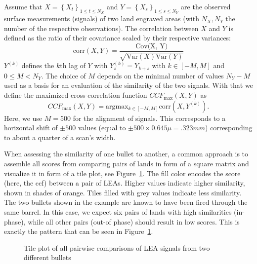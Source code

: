 \documentclass[
  12pt]{article}
\begin{document}
Assume that \(X = \left\{X_t\right\}_{1 \le t \le N_X}\) and
\(Y = \left\{X_s\right\}_{1 \le s \le N_Y}\) are the observed surface
measurements (signals) of two land engraved areas (with \(N_X, N_Y\) the
number of the respective observations). The correlation between \(X\)
and \(Y\) is defined as the ratio of their covariance scaled by their
respective variances: \[
\text{corr} (X, Y) = \frac{\text{Cov(X, Y)}}{\sqrt{\text{Var}(X) \text{Var}(Y)}}
\] \(Y^{(k)}\) defines the \(k\)th lag of \(Y\) with
\(Y^{(k)}_s = Y_{k+s}\) with \(k \in [-M, M]\) and \(0 \le M < N_Y\).
The choice of \(M\) depends on the minimal number of values \(N_Y-M\)
used as a basis for an evaluation of the similarity of the two signals.
With that we define the maximized cross-correlation function
\(CCF_{\text{max}} (X, Y)\) as \[
CCF_{\text{max}} (X, Y) = \text{arg} \text{max}_{k \in [-M, M]} \text{corr}(X, Y^{(k)}).
\] Here, we use \(M=500\) for the alignment of signals. This corresponds
to a horizontal shift of \(\pm 500\) values (equal to
\(\pm 500 \times 0.645 \mu = .323 mm\)) corresponding to about a quarter
of a scan's width.

When assessing the similarity of one bullet to another, a common
approach is to assemble all scores from comparing pairs of lands in form
of a square matrix and visualize it in form of a tile plot, see
Figure~\ref{fig-land-matrix}. The fill color encodes the score (here,
the ccf) between a pair of LEAs. Higher values indicate higher
similarity, shown in shades of orange. Tiles filled with grey values
indicate less similarity. The two bullets shown in the example are known
to have been fired through the same barrel. In this case, we expect six
pairs of lands with high similarities (in-phase), while all other pairs
(out-of phase) should result in low scores. This is exactly the pattern
that can be seen in Figure~\ref{fig-land-matrix}.

\begin{figure}[H]


\caption{\label{fig-land-matrix}Tile plot of all pairwise comparisons of
LEA signals from two different bullets}

\end{figure}%
\end{document}
